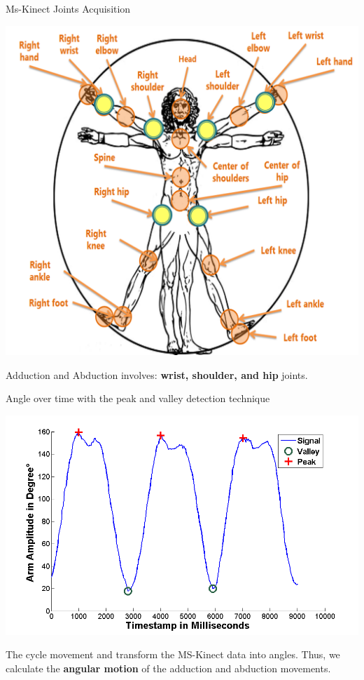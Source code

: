 \documentclass{beamer}
\begin{document}

\begin{frame}{Ms-Kinect Joints Acquisition}
  \begin{block}{}
      \center \includegraphics[height=2.5 in]{img/articulacoes-sel.png}
  \end{block}
	
	\begin{block}{}
	Adduction and Abduction involves: \textbf{wrist, shoulder, and hip} joints.
	\end{block}	
\end{frame}



\begin{frame}{Angle over time with the peak and valley detection technique}
  \begin{block}{}
      \center 
      \includegraphics[height=1.6 in]{img/signalamplitudepeakvaley-2.png}
  \end{block}
	
	\begin{block}{}
	The cycle movement and transform the MS-Kinect data into angles. Thus, we calculate the \textbf{angular motion} of the adduction and abduction movements.
	\end{block}
\end{frame}
\end{document}
